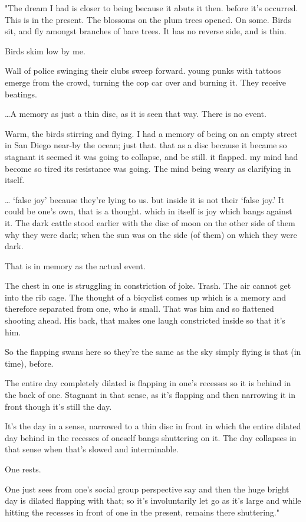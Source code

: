\documentclass[
]{memoir}
\begin{document}
"The dream I had is closer to being because it abuts it then. before
it's occurred. This is in the present. The blossoms on the plum trees
opened. On some. Birds sit, and fly amongst branches of bare trees. It
has no reverse side, and is thin.

Birds skim low by me.

Wall of police swinging their clubs sweep forward. young punks with
tattoos emerge from the crowd, turning the cop car over and burning it.
They receive beatings.

\ldots{}A memory as just a thin disc, as it is seen that way. There is
no event.

Warm, the birds stirring and flying. I had a memory of being on an empty
street in San Diego near-by the ocean; just that. that as a disc because
it became so stagnant it seemed it was going to collapse, and be still.
it flapped. my mind had become so tired its resistance was going. The
mind being weary as clarifying in itself.

\ldots{} `false joy' because they're lying to us. but inside it is not
their `false joy.' It could be one's own, that is a thought. which in
itself is joy which bangs against it. The dark cattle stood earlier with
the disc of moon on the other side of them why they were dark; when the
sun was on the side (of them) on which they were dark.

That is in memory as the actual event.

The chest in one is struggling in constriction of joke. Trash. The air
cannot get into the rib cage. The thought of a bicyclist comes up which
is a memory and therefore separated from one, who is small. That was him
and so flattened shooting ahead. His back, that makes one laugh
constricted inside so that it's him.

So the flapping swans here so they're the same as the sky simply flying
is that (in time), before.

The entire day completely dilated is flapping in one's recesses so it is
behind in the back of one. Stagnant in that sense, as it's flapping and
then narrowing it in front though it's still the day.

It's the day in a sense, narrowed to a thin disc in front in which the
entire dilated day behind in the recesses of oneself bangs shuttering on
it. The day collapses in that sense when that's slowed and interminable.

One rests.

One just sees from one's social group perspective say and then the huge
bright day is dilated flapping with that; so it's involuntarily let go
as it's large and while hitting the recesses in front of one in the
present, remains there shuttering."
\end{document}
